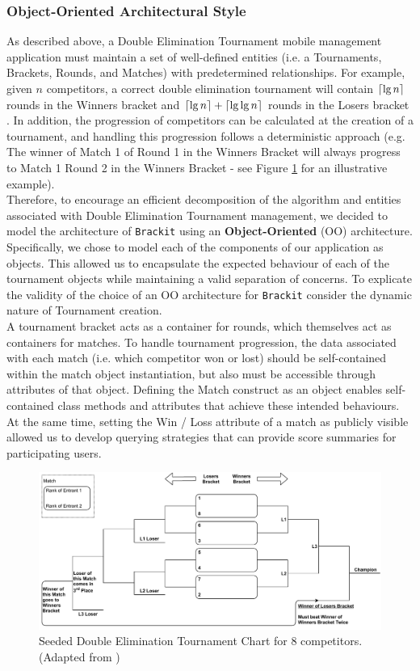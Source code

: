 \documentclass{article}
\DeclarePairedDelimiter{\ceil}{\lceil}{\rceil}
\begin{document}
\subsubsection{Object-Oriented Architectural Style}
\label{sssec:ooas}
As described above, a Double Elimination Tournament mobile management application must maintain a set of well-defined entities (i.e. a Tournaments, Brackets, Rounds, and Matches) with predetermined relationships. For example, given $n$ competitors, a correct double elimination tournament will contain $\ceil{\lg n}$ rounds in the Winners bracket and $\ceil{\lg n} + 
\ceil{\lg \lg n}$ rounds in the Losers bracket \cite{de_formula}. In addition, the progression of competitors can be calculated at the creation of a tournament, and handling this progression follows a deterministic approach (e.g. The winner of Match 1 of Round 1 in the Winners Bracket will always progress to Match 1 Round 2 in the Winners Bracket - see Figure \ref{fig:deb} for an illustrative example).\\
Therefore, to encourage an efficient decomposition of the algorithm and entities associated with Double Elimination Tournament management, we decided to model the architecture of \texttt{Brackit} using an \textbf{Object-Oriented} (OO) architecture. 
Specifically, we chose to model each of the components of our application as objects. This allowed us to encapsulate the expected behaviour of each of the tournament objects while maintaining a valid separation of concerns. To explicate the validity of the choice of an OO architecture for \texttt{Brackit} consider the dynamic nature of Tournament creation.\\
A tournament bracket acts as a container for rounds, which themselves act as containers for matches.
To handle tournament progression, the data associated with each match (i.e. which competitor won or lost) should be self-contained within the match object instantiation, but also must be accessible through attributes of that object. Defining the Match construct as an object enables self-contained class methods and attributes that achieve these intended behaviours. At the same time, setting the Win / Loss attribute of a match as publicly visible allowed us to develop querying strategies that can provide score summaries for participating users. 
    \begin{figure}[htp]
        \centering
        \includegraphics[width=12cm]{../diagrams/double_elim_bracket_comp.pdf}
        \caption{Seeded Double Elimination Tournament Chart for 8 competitors. (Adapted from \cite{se:tba})}
        \label{fig:deb}
        \end{figure}
\end{document}
